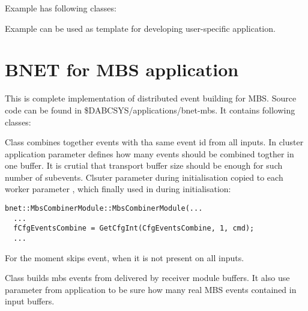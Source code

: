 Example has following classes:
\bbul
\item  {}
\item  {}
\item  {}
\item  {}
\item  {}
\item  {}
\ebul

Example can be used as template for developing user-specific application. 


\section{BNET for MBS application}

This is complete implementation of distributed event building for MBS.
Source code can be found in \$DABCSYS/applications/bnet-mbs. It contains following
classes:
\bbul
\item  {}
\item  {}
\item  {}
\item  {}
\ebul

Class  combines together  
events with tha same event id from all inputs. 
In cluster application parameter  defines how many
events should be combined togther in one buffer. It is crutial that transport
buffer size should be enough for such number of subevents. 
Clsuter parameter  during initialisation copied to each
worker parameter , which finally used in 
during initialisation: 
   
\begin{small}
\begin{verbatim}
bnet::MbsCombinerModule::MbsCombinerModule(...  
  ...
  fCfgEventsCombine = GetCfgInt(CfgEventsCombine, 1, cmd);
  ...
\end{verbatim}
\end{small}

For the moment  skips event, when it is not present on all inputs. 

Class  builds mbs events from 
delivered by receiver module buffers. It also use parameter
 from application to be sure how many real MBS events
contained in input buffers.
  
